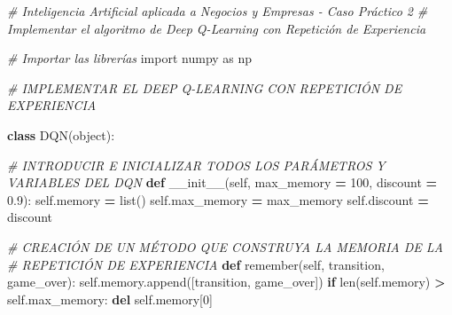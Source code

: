 \documentclass[
]{book}
\newenvironment{Shaded}{\begin{snugshade}}{\end{snugshade}}
\newcommand{\BuiltInTok}[1]{#1}
\newcommand{\CommentTok}[1]{\textcolor[rgb]{0.56,0.35,0.01}{\textit{#1}}}
\newcommand{\ControlFlowTok}[1]{\textcolor[rgb]{0.13,0.29,0.53}{\textbf{#1}}}
\newcommand{\DecValTok}[1]{\textcolor[rgb]{0.00,0.00,0.81}{#1}}
\newcommand{\FloatTok}[1]{\textcolor[rgb]{0.00,0.00,0.81}{#1}}
\newcommand{\FunctionTok}[1]{\textcolor[rgb]{0.00,0.00,0.00}{#1}}
\newcommand{\ImportTok}[1]{#1}
\newcommand{\KeywordTok}[1]{\textcolor[rgb]{0.13,0.29,0.53}{\textbf{#1}}}
\newcommand{\NormalTok}[1]{#1}
\newcommand{\OperatorTok}[1]{\textcolor[rgb]{0.81,0.36,0.00}{\textbf{#1}}}
\newcommand{\VariableTok}[1]{\textcolor[rgb]{0.00,0.00,0.00}{#1}}
\begin{document}
\begin{Shaded}
\begin{Highlighting}[]
\CommentTok{\# Inteligencia Artificial aplicada a Negocios y Empresas {-} Caso Práctico 2}
\CommentTok{\# Implementar el algoritmo de Deep Q{-}Learning con Repetición de Experiencia}

\CommentTok{\# Importar las librerías}
\ImportTok{import}\NormalTok{ numpy }\ImportTok{as}\NormalTok{ np}

\CommentTok{\# IMPLEMENTAR EL DEEP Q{-}LEARNING CON REPETICIÓN DE EXPERIENCIA}

\KeywordTok{class}\NormalTok{ DQN(}\BuiltInTok{object}\NormalTok{):}
    
    \CommentTok{\# INTRODUCIR E INICIALIZAR TODOS LOS PARÁMETROS Y VARIABLES DEL DQN}
    \KeywordTok{def} \FunctionTok{\_\_init\_\_}\NormalTok{(}\VariableTok{self}\NormalTok{, max\_memory }\OperatorTok{=} \DecValTok{100}\NormalTok{, discount }\OperatorTok{=} \FloatTok{0.9}\NormalTok{):}
        \VariableTok{self}\NormalTok{.memory }\OperatorTok{=} \BuiltInTok{list}\NormalTok{()}
        \VariableTok{self}\NormalTok{.max\_memory }\OperatorTok{=}\NormalTok{ max\_memory}
        \VariableTok{self}\NormalTok{.discount }\OperatorTok{=}\NormalTok{ discount}

    \CommentTok{\# CREACIÓN DE UN MÉTODO QUE CONSTRUYA LA MEMORIA DE LA }
    \CommentTok{\# REPETICIÓN DE EXPERIENCIA}
    \KeywordTok{def}\NormalTok{ remember(}\VariableTok{self}\NormalTok{, transition, game\_over):}
        \VariableTok{self}\NormalTok{.memory.append([transition, game\_over])}
        \ControlFlowTok{if} \BuiltInTok{len}\NormalTok{(}\VariableTok{self}\NormalTok{.memory) }\OperatorTok{\textgreater{}} \VariableTok{self}\NormalTok{.max\_memory:}
            \KeywordTok{del} \VariableTok{self}\NormalTok{.memory[}\DecValTok{0}\NormalTok{]}


\end{Highlighting}
\end{Shaded}
\end{document}
